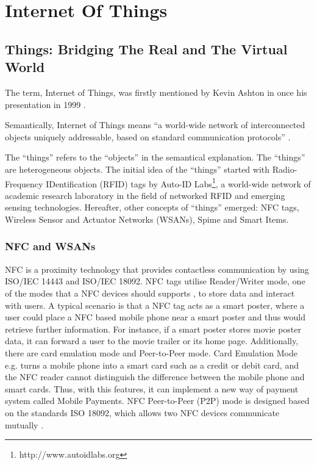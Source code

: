 \chapter{Internet Of Things}
\label{chapter:internetofthings} 

\section{Things: Bridging The Real and The Virtual World}

The term, Internet of Things, was firstly mentioned by Kevin Ashton in once his presentation in 1999 \cite{ashton2009internet}.

Semantically, Internet of Things means ``a world-wide network of interconnected objects uniquely addressable, based on standard communication protocols'' \cite{infso2008networked}. 

The ``things'' refers to the ``objects'' in the semantical explanation. The ``things'' are heterogeneous objects. The initial idea of the ``things'' started with Radio-Frequency IDentification (RFID) tags by Auto-ID Labs\footnote{http://www.autoidlabs.org}, a world-wide network of academic research laboratory in the field of networked RFID and emerging sensing technologies. Hereafter, other concepts of ``things'' emerged: NFC tags, Wireless Sensor and Actuator Networks (WSANs), Spime and Smart Items.

\subsection{NFC and WSANs}

NFC is a proximity technology that provides contactless communication by using ISO/IEC 14443 and ISO/IEC 18092. NFC tags utilise Reader/Writer mode, one of the modes that a NFC devices should supports \cite{Madlmayr:SecurityandPrivacy}, to store data and interact with users. A typical scenario is that a NFC tag acts as a smart poster, where a user could place a NFC based mobile phone near a smart poster and thus would retrieve further information. For instance, if a smart poster stores movie poster data, it can forward a user to the movie trailer or its home page. Additionally, there are card emulation mode and Peer-to-Peer mode. Card Emulation Mode e.g. turns a mobile phone into a smart card such as a credit or debit card, and the NFC reader cannot distinguish the difference between the mobile phone and smart cards. Thus, with this features, it can implement a new way of payment system called Mobile Payments. NFC Peer-to-Peer (P2P) mode is designed based on the standards ISO 18092, which allows two NFC devices communicate mutually \cite{Madlmayr:SecurityandPrivacy}.

